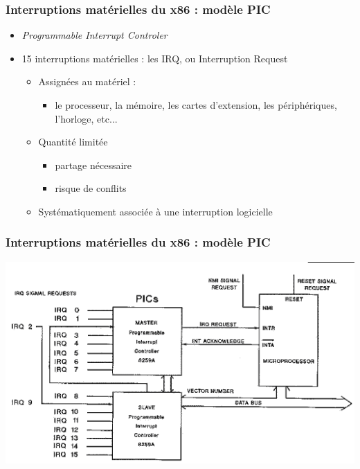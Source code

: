\begin{frame}
 \frametitle{Interruptions matérielles du x86 : modèle PIC}
 \begin{itemize}
 \item \textit{Programmable Interrupt Controler}
 \item 15 interruptions matérielles : les IRQ, ou Interruption Request
\begin{itemize}
\item Assignées au matériel :
\begin{itemize}
\item le processeur, la mémoire, les cartes d'extension, les périphériques, l'horloge, etc...
\end{itemize}
\item Quantité limitée
\begin{itemize}
\item partage nécessaire
\item risque de conflits
\end{itemize}
\item Systématiquement associée à une interruption logicielle
\end{itemize}
\end{itemize}
\end{frame}

\begin{frame}
\frametitle{Interruptions matérielles du x86 : modèle PIC}
\includegraphics[width=.8\textwidth]{../illustration/interruption_PIC.png}
\end{frame}


